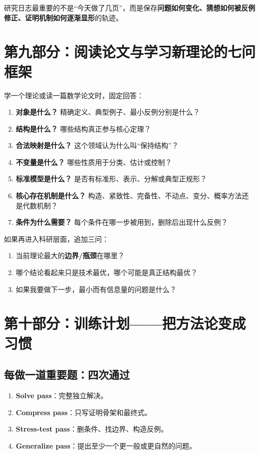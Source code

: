 \documentclass[11pt,a4paper]{ctexart}
\newcommand{\concept}[1]{\textbf{\color{deepblue}#1}}
\newcommand{\keyword}[1]{\textbf{#1}}
\begin{document}
研究日志最重要的不是“今天做了几页”，而是保存\concept{问题如何变化、猜想如何被反例修正、证明机制如何逐渐显形}的轨迹。

\section{第九部分：阅读论文与学习新理论的七问框架}

学一个理论或读一篇数学论文时，固定回答：

\begin{enumerate}
  \item \keyword{对象是什么？} 精确定义、典型例子、最小反例分别是什么？
  \item \keyword{结构是什么？} 哪些结构真正参与核心定理？
  \item \keyword{合法映射是什么？} 这个领域认为什么叫“保持结构”？
  \item \keyword{不变量是什么？} 哪些性质用于分类、估计或控制？
  \item \keyword{标准模型是什么？} 是否有标准形、表示、分解或典型正规形？
  \item \keyword{核心存在机制是什么？} 构造、紧致性、完备性、不动点、变分、概率方法还是代数机制？
  \item \keyword{条件为什么需要？} 每个条件在哪一步被用到，删除后出现什么反例？
\end{enumerate}

如果再进入科研层面，追加三问：
\begin{enumerate}[resume]
  \item 当前理论最大的\textbf{边界/瓶颈}在哪里？
  \item 哪个结论看起来只是技术最优，哪个可能是真正结构最优？
  \item 如果我要做下一步，最小而有信息量的问题是什么？
\end{enumerate}

\section{第十部分：训练计划——把方法论变成习惯}

\subsection{每做一道重要题：四次通过}

\begin{enumerate}
  \item \keyword{Solve pass}：完整独立解决。
  \item \keyword{Compress pass}：只写证明骨架和最终式。
  \item \keyword{Stress-test pass}：删条件、找边界、构造反例。
  \item \keyword{Generalize pass}：提出至少一个更一般或更自然的问题。
\end{enumerate}
\end{document}
